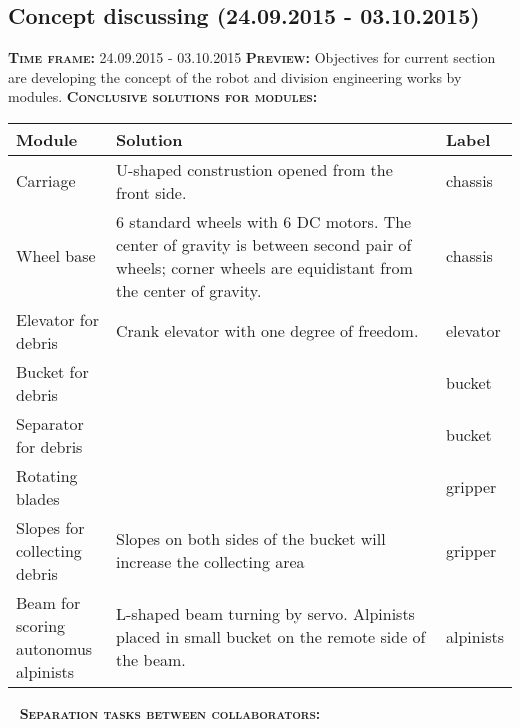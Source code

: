 \subsection{Concept discussing (24.09.2015 - 03.10.2015)}
	\textsc{\textbf{Time frame:}} 24.09.2015 - 03.10.2015 \newline
	\textsc{\textbf{Preview:}} Objectives for current section are developing the concept of the robot and division engineering works by modules. \newline
	\textsc{\textbf{Conclusive solutions for modules:}}
	
	\begin{table}[H]
		\vspace{-2mm}
		\begin{center}
			\begin{tabular}{|p{0.2\linewidth}|p{0.7\linewidth}|p{0.1\linewidth}|}
				\hline
				Module & Solution & Label \\
				\hline
				Carriage & U-shaped construstion opened from the front side. & chassis \\
				\hline
				Wheel base & 6 standard wheels with 6 DC motors. The center of gravity is between second pair of wheels; corner wheels are equidistant from the center of gravity. & chassis \\
				\hline
				Elevator for debris & Crank elevator with one degree of freedom. & elevator \\
				\hline
				Bucket for debris &  & bucket \\
				\hline
				Separator for debris &  & bucket \\
				\hline
				Rotating blades &  & gripper \\
				\hline
				Slopes for collecting debris & Slopes on both sides of the bucket will increase the collecting area & gripper \\
				\hline
				Beam for scoring autonomus alpinists & L-shaped beam turning by servo. Alpinists placed in small bucket on the remote side of the beam. & alpinists \\
				\hline
			\end{tabular}
		\end{center}
	\end{table}
	\vspace{-10mm}
	 \newline
	\textsc{\textbf{Separation tasks between collaborators:}}
	
